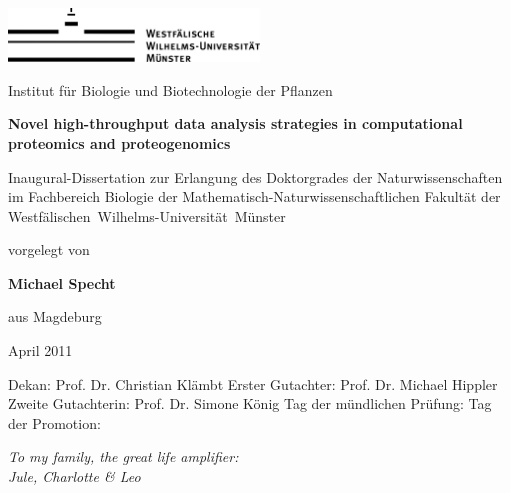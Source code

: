 \documentclass[11pt,a4paper,twoside]{report}
\begin{document}


\begin{center}
\includegraphics[width=0.5\textwidth]{figures/wwu-logo-black.jpg}

{\Large Institut f\"ur Biologie und Biotechnologie der Pflanzen}

\vspace*{5cm}

{\bf \Huge Novel high-throughput data analysis strategies in computational proteomics and proteogenomics}

\vspace*{4cm}

{\Large Inaugural-Dissertation zur Erlangung des Doktorgrades der
Naturwissenschaften im Fachbereich Biologie der
Mathematisch-Naturwissenschaftlichen Fakult\"at der
\mbox{Westf\"alischen Wilhelms-Universit\"at M\"unster}}

\vspace*{2cm}

{\Large vorgelegt von}

{\LARGE \bf Michael Specht}

{\Large aus Magdeburg}

{\LARGE April 2011}

\end{center}

\cleardoublepage

\vspace*{550pt}

Dekan: Prof. Dr. Christian Kl\"ambt \newline
Erster Gutachter: Prof. Dr. Michael Hippler \newline
Zweite Gutachterin: Prof. Dr. Simone K\"onig \newline
Tag der m\"undlichen Pr\"ufung: \newline
Tag der Promotion: \newline

\cleardoublepage

\vspace*{200pt}
\begin{flushright}
{\Large\em
To my family, the great life amplifier: \\
Jule, Charlotte \& Leo
}
\end{flushright}
\end{document}
